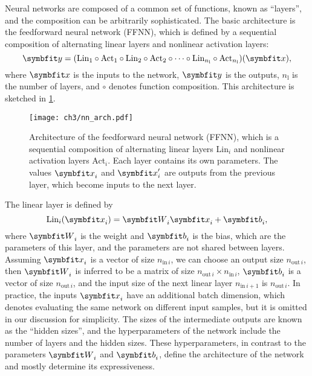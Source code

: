 Neural networks are composed of a common set of functions, known as ``layers'', and the composition can be arbitrarily sophisticated. The basic architecture is the feedforward neural network (FFNN), which is defined by a sequential composition of alternating linear layers and nonlinear activation layers:
\begin{equation}
\vy = (\text{Lin}_1 \circ \text{Act}_1 \circ \text{Lin}_2 \circ \text{Act}_2 \circ \cdots \circ \text{Lin}_{n_\text{l}} \circ \text{Act}_{n_\text{l}})(\vx),
\label{eq:ffnn}
\end{equation}
where $\vx$ is the inputs to the network, $\vy$ is the outputs, $n_\text{l}$ is the number of layers, and $\circ$ denotes function composition. This architecture is sketched in \cref{fig:nn-arch}.

\begin{figure}[htb]
\centering
\texttt{[image: ch3/nn\_arch.pdf]}
\caption[Architecture of feedforward neural network]{
Architecture of the feedforward neural network (FFNN), which is a sequential composition of alternating linear layers Lin$_i$ and nonlinear activation layers Act$_i$. Each layer contains its own parameters. The values $\vx_i$ and $\vx'_i$ are outputs from the previous layer, which become inputs to the next layer.
}
\label{fig:nn-arch}
\end{figure}

The linear layer is defined by
\begin{equation}
\text{Lin}_i(\vx_i) = \mW_i \vx_i + \mb_i,
\label{eq:linear-layer}
\end{equation}
where $\mW_i$ is the weight and $\mb_i$ is the bias, which are the parameters of this layer, and the parameters are not shared between layers. Assuming $\vx_i$ is a vector of size $n_{\text{in}\,i}$, we can choose an output size $n_{\text{out}\,i}$, then $\mW_i$ is inferred to be a matrix of size $n_{\text{out}\,i} \times n_{\text{in}\,i}$, $\mb_i$ is a vector of size $n_{\text{out}\,i}$, and the input size of the next linear layer $n_{\text{in}\,i + 1}$ is $n_{\text{out}\,i}$.
In practice, the inputs $\vx_i$ have an additional batch dimension, which denotes evaluating the same network on different input samples, but it is omitted in our discussion for simplicity. The sizes of the intermediate outputs are known as the ``hidden sizes'', and the hyperparameters of the network include the number of layers and the hidden sizes. These hyperparameters, in contrast to the parameters $\mW_i$ and $\mb_i$, define the architecture of the network and mostly determine its expressiveness.

